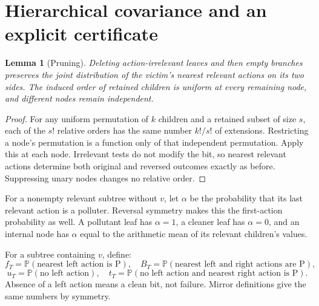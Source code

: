 \documentclass[11pt,a4paper]{article}
\newtheorem{lemma}[theorem]{Lemma}
\theoremstyle{definition}\newtheorem{definition}[theorem]{Definition}
\theoremstyle{remark}\newtheorem{remark}[theorem]{Remark}
\newcommand{\Prb}{\mathbb P}
\theoremstyle{definition}\newtheorem{xexample}[xtheorem]{Example}\theoremstyle{plain}
\begin{document}
\section{Hierarchical covariance and an explicit certificate}
\begin{lemma}[Pruning]
Deleting action-irrelevant leaves and then empty branches preserves the joint distribution of the victim's nearest relevant actions on its two sides. The induced order of retained children is uniform at every remaining node, and different nodes remain independent.
\end{lemma}
\begin{proof}
For any uniform permutation of $k$ children and a retained subset of size $s$, each of the $s!$ relative orders has the same number $k!/s!$ of extensions. Restricting a node's permutation is a function only of that independent permutation. Apply this at each node. Irrelevant tests do not modify the bit, so nearest relevant actions determine both original and reversed outcomes exactly as before. Suppressing unary nodes changes no relative order.
\end{proof}

For a nonempty relevant subtree without $v$, let $\alpha$ be the probability that its last relevant action is a polluter. Reversal symmetry makes this the first-action probability as well. A pollutant leaf has $\alpha=1$, a cleaner leaf has $\alpha=0$, and an internal node has $\alpha$ equal to the arithmetic mean of its relevant children's values.

For a subtree containing $v$, define:
\[
 f_T=\Prb(\text{nearest left action is P}),\quad
 B_T=\Prb(\text{nearest left and right actions are P}),
\]
\[
 u_T=\Prb(\text{no left action}),\quad
 t_T=\Prb(\text{no left action and nearest right action is P}).
\]
Absence of a left action means a clean bit, not failure. Mirror definitions give the same numbers by symmetry.
\end{document}
